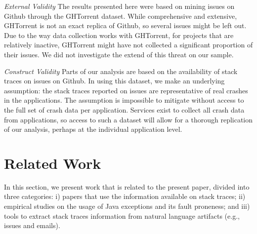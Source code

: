 \documentclass[conference]{IEEEtran}
\begin{document}
\noindent\emph{External Validity} The results presented here were based on mining
issues on Github through the GHTorrent dataset. While comprehensive and
extensive, GHTorrent is not an exact replica of Github, so several issues might
be left out. Due to the way data collection works with GHTorrent, for projects
that are relatively inactive, GHTorrent might have not collected a significant
proportion of their issues. We did not investigate the extend of this threat on
our sample.

\noindent\emph{Construct Validity} Parts of our analysis are based on the availability of stack traces on issues on
Github. In using this dataset, we make an underlying assumption: the
stack traces reported on issues are representative of real crashes in
the applications. The assumption is impossible to mitigate without access to
the full set of crash data per application. Services exist to collect all
crash data from applications, so access to such a dataset will allow for
a thorough replication of our analysis, perhaps at the individual application
level.

\section{Related Work}

In this section, we present work that is related to the present paper, divided into
three categories: i) papers that use the information available on stack traces;
ii) empirical studies on the usage of Java exceptions and its fault proneness;
and iii) tools to extract stack traces information from natural language artifacts
(e.g., issues and emails).
\end{document}
